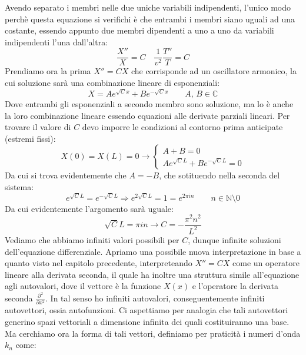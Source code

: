 Avendo separato i membri nelle due uniche variabili indipendenti, l'unico modo perchè questa equazione si verifichi è che entrambi i membri siano uguali ad una costante, essendo appunto due membri dipendenti a uno a uno da variabili indipendenti l'una dall'altra:
\begin{equation*}
    \frac{X''}{X} = C \quad \frac{1}{v^2} \frac{T''}{T} = C
\end{equation*}
Prendiamo ora la prima $X''=CX$ che corrisponde ad un oscillatore armonico, la cui soluzione sarà una combinazione lineare di esponenziali:
\begin{equation*}
    X = A e^{\sqrt{C}x} + B e^{-\sqrt{C}x} \qquad A, \, B \in \mathbb{C}
\end{equation*}
Dove entrambi gli esponenziali a secondo membro sono soluzione, ma lo è anche la loro combinazione lineare essendo equazioni alle derivate parziali lineari. Per trovare il valore di $C$ devo imporre le condizioni al contorno prima anticipate (estremi fissi):
\begin{equation*}
    X(0) = X(L) = 0 \longrightarrow
    \begin{cases}
        A+B=0 \\
        A e^{\sqrt{C}L} + B e^{-\sqrt{C}L} = 0
    \end{cases}
\end{equation*}
Da cui si trova evidentemente che $A=-B$, che sotituendo nella seconda del sistema:
\begin{equation*}
    e^{\sqrt{C}L} = e^{-\sqrt{C}L} \Longrightarrow
    e^{2\sqrt{C}L} = 1 = e^{2\pi in} \qquad
    n\in\mathbb{N}\setminus {0}
\end{equation*}
Da cui evidentemente l'argomento sarà uguale:
\begin{equation*}
    \sqrt{C}L = \pi in \longrightarrow
    C = - \frac{\pi^2n^2}{L^2}
\end{equation*}
Vediamo che abbiamo infiniti valori possibili per $C$, dunque infinite soluzioni dell'equazione differenziale. Apriamo una possibile nuova interpretazione in base a quanto visto nel capitolo precedente, interpreteando $X''=CX$ come un operatore lineare alla derivata seconda, il quale ha inoltre una struttura simile all'equazione agli autovalori, dove il vettore è la funzione $X(x)$ e l'operatore la derivata seconda $\frac{\partial^2}{\partial x^2}$. In tal senso ho infiniti autovalori, conseguentemente infiniti autovettori, ossia autofunzioni. Ci aspettiamo per analogia che tali autovettori generino spazi vettoriali a dimensione infinita dei quali costituiranno una base. Ma cerchiamo ora la forma di tali vettori, definiamo per praticità i numeri d'onda $k_n$ come:
